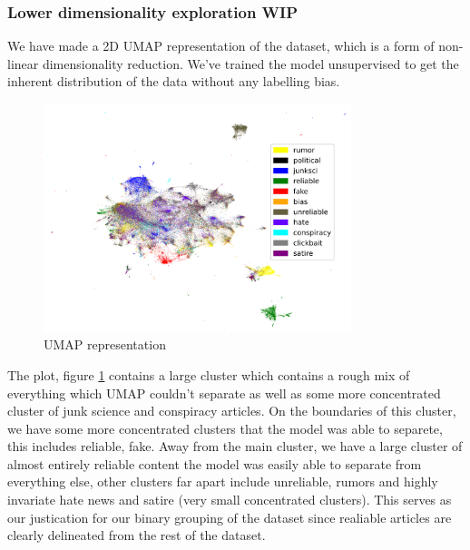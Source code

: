 \subsubsection{Lower dimensionality exploration WIP}
We have made a 2D UMAP representation of the dataset, which is a form of non-linear dimensionality reduction. We've
trained the model unsupervised to get the inherent distribution of the data without any labelling bias.
\begin{figure}[htpb]
  \centering
  \includegraphics[width=0.8\textwidth]{figures/WOLiar_cropped}
  \caption{UMAP representation}
  \label{fig:umap_explore}
\end{figure}

The plot, figure \ref{fig:umap_explore} contains a large cluster which contains a rough mix of everything which UMAP couldn't separate as well as some more concentrated cluster of junk science and conspiracy articles. On the boundaries of this cluster, we have some more concentrated clusters that the model was able to separete, this includes reliable, fake. Away from the main cluster, we have a large cluster of almost entirely reliable content the model was easily able to separate from everything else, other clusters far apart include unreliable, rumors and highly invariate hate news and satire (very small concentrated clusters). This serves as our justication for our binary grouping of the dataset since realiable articles are clearly delineated from the rest of the dataset. 



